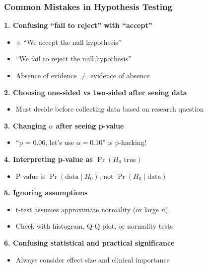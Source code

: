 \documentclass{beamer}
\begin{document}
\begin{frame}
\frametitle{Common Mistakes in Hypothesis Testing}
\textbf{1. Confusing ``fail to reject'' with ``accept''}
\begin{itemize}
\item $\times$ ``We accept the null hypothesis''
\item \checkmark ``We fail to reject the null hypothesis''
\item Absence of evidence $\neq$ evidence of absence
\end{itemize}

\vspace{0.1cm}
\textbf{2. Choosing one-sided vs two-sided after seeing data}
\begin{itemize}
\item Must decide before collecting data based on research question
\end{itemize}

\vspace{0.1cm}
\textbf{3. Changing $\alpha$ after seeing p-value}
\begin{itemize}
\item ``p = 0.06, let's use $\alpha = 0.10$'' is p-hacking!
\end{itemize}

\vspace{0.1cm}
\textbf{4. Interpreting p-value as $\Pr(H_0 \text{ true})$}
\begin{itemize}
\item P-value is $\Pr(\text{data} \mid H_0)$, not $\Pr(H_0 \mid \text{data})$
\end{itemize}

\vspace{0.1cm}
\textbf{5. Ignoring assumptions}
\begin{itemize}
\item t-test assumes approximate normality (or large $n$)
\item Check with histogram, Q-Q plot, or normality tests
\end{itemize}

\vspace{0.1cm}
\textbf{6. Confusing statistical and practical significance}
\begin{itemize}
\item Always consider effect size and clinical importance
\end{itemize}
\end{frame}
\end{document}
